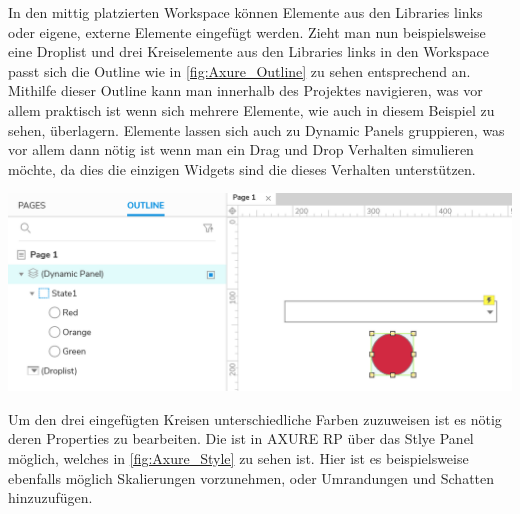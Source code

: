 In den mittig platzierten Workspace können Elemente aus den Libraries links oder eigene, externe Elemente eingefügt werden.
Zieht man nun beispielsweise eine Droplist und drei Kreiselemente aus den Libraries links in den Workspace passt sich die Outline wie in \cref{fig:Axure_Outline} zu sehen entsprechend an.
Mithilfe dieser Outline kann man innerhalb des Projektes navigieren, was vor allem praktisch ist wenn sich mehrere Elemente, wie auch in diesem Beispiel zu sehen, überlagern.
Elemente lassen sich auch zu Dynamic Panels gruppieren, was vor allem dann nötig ist wenn man ein Drag und Drop Verhalten simulieren möchte, da dies die einzigen Widgets sind die dieses Verhalten unterstützen.

\begin{center}
  \includegraphics[scale=0.4]{figures/AXURE_Outline.PNG}
  \label{fig:Axure_Outline}
\end{center}

Um den drei eingefügten Kreisen unterschiedliche Farben zuzuweisen ist es nötig deren Properties zu bearbeiten.
Die ist in AXURE RP über das Stlye Panel möglich, welches in \cref{fig:Axure_Style} zu sehen ist.
Hier ist es beispielsweise ebenfalls möglich Skalierungen vorzunehmen, oder Umrandungen und Schatten hinzuzufügen.

